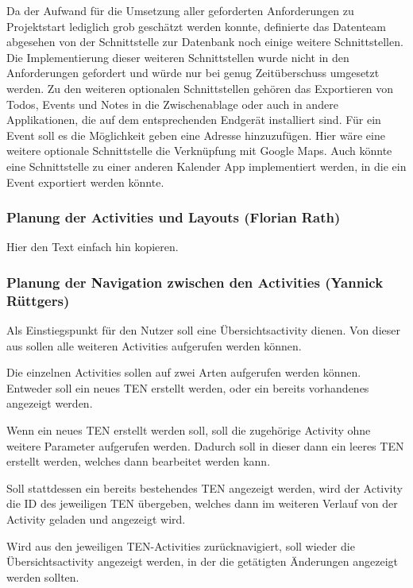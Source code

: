 Da der Aufwand für die Umsetzung aller geforderten Anforderungen zu Projektstart lediglich grob geschätzt werden konnte, definierte das Datenteam abgesehen von der Schnittstelle zur Datenbank noch einige weitere Schnittstellen. Die Implementierung dieser weiteren Schnittstellen wurde nicht in den Anforderungen gefordert und würde nur bei genug Zeitüberschuss umgesetzt werden. Zu den weiteren optionalen Schnittstellen gehören das Exportieren von Todos, Events und Notes in die Zwischenablage oder auch in andere Applikationen, die auf dem entsprechenden Endgerät installiert sind. Für ein Event soll es die Möglichkeit geben eine Adresse hinzuzufügen. Hier wäre eine weitere optionale Schnittstelle die Verknüpfung mit Google Maps. Auch könnte eine Schnittstelle zu einer anderen Kalender App implementiert werden, in die ein Event exportiert werden könnte.

\newpage

\subsubsection{Planung der Activities und Layouts (Florian Rath)}

Hier den Text einfach hin kopieren.

\subsubsection{Planung der Navigation zwischen den Activities (Yannick Rüttgers)}

Als Einstiegspunkt für den Nutzer soll eine Übersichtsactivity dienen. Von dieser aus sollen alle weiteren Activities aufgerufen werden können.

Die einzelnen Activities sollen auf zwei Arten aufgerufen werden können. Entweder soll ein neues TEN erstellt werden, oder ein bereits vorhandenes angezeigt werden.

Wenn ein neues TEN erstellt werden soll, soll die zugehörige Activity ohne weitere Parameter aufgerufen werden. Dadurch soll in dieser dann ein leeres TEN erstellt werden, welches dann bearbeitet werden kann.

Soll stattdessen ein bereits bestehendes TEN angezeigt werden, wird der Activity die ID des jeweiligen TEN übergeben, welches dann im weiteren Verlauf von der Activity geladen und angezeigt wird.

Wird aus den jeweiligen TEN-Activities zurücknavigiert, soll wieder die Übersichtsactivity angezeigt werden, in der die getätigten Änderungen angezeigt werden sollten.

